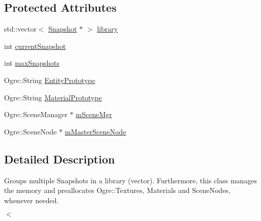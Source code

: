 \subsection*{\-Protected \-Attributes}
\begin{DoxyCompactItemize}
\item 
std\-::vector$<$ \hyperlink{classSnapshot}{\-Snapshot} $\ast$ $>$ \hyperlink{classSnapshotLibrary_adc6f783d638a9ff4744b16bfa66b8953}{library}
\item 
int \hyperlink{classSnapshotLibrary_ac57409313d63db08bf743da47c768781}{current\-Snapshot}
\item 
int \hyperlink{classSnapshotLibrary_a8d1f7abf98dbb1f9cb8e82657218b850}{max\-Snapshots}
\item 
\-Ogre\-::\-String \hyperlink{classSnapshotLibrary_a968263cf5e86e9d2be54bae17fd69b00}{\-Entity\-Prototype}
\item 
\-Ogre\-::\-String \hyperlink{classSnapshotLibrary_a34479d4ccada0297ff80a41a4adf5100}{\-Material\-Prototype}
\item 
\-Ogre\-::\-Scene\-Manager $\ast$ \hyperlink{classSnapshotLibrary_a59737af324c6e35b0fe67b1ad60b8a8a}{m\-Scene\-Mgr}
\item 
\-Ogre\-::\-Scene\-Node $\ast$ \hyperlink{classSnapshotLibrary_aa510467111273c06dceeb3435d586e66}{m\-Master\-Scene\-Node}
\end{DoxyCompactItemize}


\subsection{\-Detailed \-Description}
\-Groups multiple \-Snapshots in a library (vector). \-Furthermore, this class manages the memory and preallocates \-Ogre\-::\-Textures, \-Materials and \-Scene\-Nodes, whenever needed. 

$<$ 

